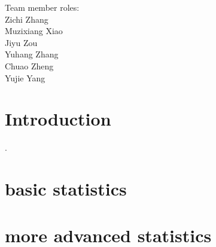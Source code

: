 \documentclass[a4paper,12pt,reqno]{report}
\begin{document}


\vspace*{\fill}
\begin{flushleft}
    Team member roles:\\
    Zichi Zhang\\
    Muzixiang Xiao\\
    Jiyu Zou\\
    Yuhang Zhang\\
    Chuao Zheng\\
    Yujie Yang
\end{flushleft}
\vspace*{\fill}
\thispagestyle{empty}

\begin{abstract}

\end{abstract}

\section{Introduction}
\label{sec:Introduction}
\cite{Basic_Information_about_NO2}. 
\newpage

\section{basic statistics}
\label{sec:basic statistics}

\section{more advanced statistics}
\label{sec:more advanced statistics}
\end{document}
